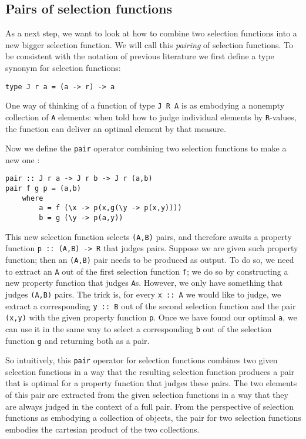 \documentclass[runningheads]{llncs}
\begin{document}
\subsection{Pairs of selection functions}
As a next step, we want to look at how to combine two selection functions into a new bigger selection function. We will call this \emph{pairing} of selection functions.
To be consistent with the notation of previous literature we first define a type synonym for selection functions:
\begin{verbatim}
type J r a = (a -> r) -> a
\end{verbatim}
One way of thinking of a function of type \texttt{J R A} is as embodying a nonempty collection of \texttt{A} elements: when told how to judge individual elements by \texttt{R}-values, the function can deliver an optimal element by that measure.

Now we define the \texttt{pair} operator combining two selection functions to make a new one \cite{escardo2010sequential}:
\begin{verbatim}
pair :: J r a -> J r b -> J r (a,b)
pair f g p = (a,b)
    where
        a = f (\x -> p(x,g(\y -> p(x,y))))
        b = g (\y -> p(a,y))
\end{verbatim}
This new selection function selects \texttt{(A,B)} pairs, and therefore awaits a property function \texttt{p :: (A,B) -> R} that judges pairs. Suppose we are given such property function; then an \texttt{(A,B)} pair needs to be produced as output. To do so, we need to extract an \texttt{A} out of the first selection function \texttt{f}; we do so by constructing a new property function that judges \texttt{A}s. However, we only have something that judges \texttt{(A,B)} pairs. The trick is, for every \texttt{x :: A} we would like to judge, we extract a corresponding \texttt{y :: B} out of the second selection function and the pair \texttt{(x,y)} with the given property function \texttt{p}. Once we have found our optimal \texttt{a}, we can use it in the same way to select a corresponding \texttt{b} out of the selection function \texttt{g} and returning both as a pair.

So intuitively, this \texttt{pair} operator for selection functions combines two given selection functions in a way that the resulting selection function produces a pair that is optimal for a property function that judges these pairs. The two elements of this pair are extracted from the given selection functions in a way that they are always judged in the context of a full pair. From the perspective of selection functions as embodying a collection of objects, the pair for two selection functions embodies the cartesian product of the two collections.
%
%
%
\end{document}
